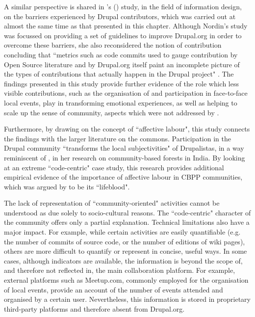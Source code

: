 A similar perspective is shared in \citeauthor{nordinmotivation2014}'s (\citeyear{nordinmotivation2014}) study, in the field of information design, on the barriers experienced by Drupal contributors, which was carried out at almost the same time as that presented in this chapter. Although Nordin's study was focussed on providing a set of guidelines to improve Drupal.org in order to overcome these barriers, she also reconsidered the notion of contribution concluding that ``metrics such as code commits used to gauge contribution by Open Source literature and by Drupal.org itself paint an incomplete picture of the types of contributions that actually happen in the Drupal project" \parencite[][43]{nordinmotivation2014}. The findings presented in this study provide further evidence of the role which less visible contributions, such as the organisation of and participation in face-to-face local events, play in transforming emotional experiences, as well as helping to scale up the sense of community, aspects which were not addressed by \textcite[][28-30]{nordinmotivation2014}.

Furthermore, by drawing on the concept of ``affective labour", this study connects the findings with the larger literature on the commons. Participation in the Drupal community ``transforms the local subjectivities" of Drupalistas, in a way reminiscent of \textcite{Singh2013}, in her research on community-based forests in India. By looking at an extreme ``code-centric" case study, this research provides additional empirical evidence of the importance of affective labour in CBPP communities, which was argued by \textcite{Bollier2014} to be its ``lifeblood".

The lack of representation of ``community-oriented" activities cannot be understood as due solely to socio-cultural reasons. The ``code-centric" character of the community offers only a partial explanation. Technical limitations also have a major impact. For example, while certain activities are easily quantifiable (e.g. the number of commits of source code, or the number of editions of wiki pages), others are more difficult to  quantify or represent in concise, useful ways. In some cases, although  indicators are available, the information is beyond the scope of, and therefore not reflected in, the main collaboration platform. For example, external platforms such as Meetup.com, commonly employed for the organisation of local events, provide an account of the number of events attended and organised by a certain user. Nevertheless, this information is stored in proprietary third-party platforms and therefore absent from Drupal.org.

